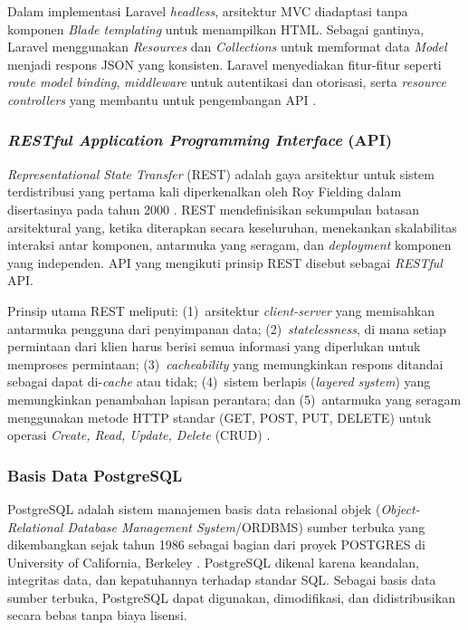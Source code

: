 Dalam implementasi Laravel \textit{headless}, arsitektur MVC diadaptasi tanpa komponen \textit{Blade templating} untuk menampilkan HTML. Sebagai gantinya, Laravel menggunakan \textit{Resources} dan \textit{Collections} untuk memformat data \textit{Model} menjadi respons JSON yang konsisten. Laravel menyediakan fitur-fitur seperti \textit{route model binding}, \textit{middleware} untuk autentikasi dan otorisasi, serta \textit{resource controllers} yang membantu untuk pengembangan API \citep{Laravel_2026_Docs}.


\subsubsection{\textit{RESTful Application Programming Interface} (API)}

\textit{Representational State Transfer} (REST) adalah gaya arsitektur untuk sistem terdistribusi yang pertama kali diperkenalkan oleh Roy Fielding dalam disertasinya pada tahun 2000 \citep{Fielding_2000_REST}. REST mendefinisikan sekumpulan batasan arsitektural yang, ketika diterapkan secara keseluruhan, menekankan skalabilitas interaksi antar komponen, antarmuka yang seragam, dan \textit{deployment} komponen yang independen. API yang mengikuti prinsip REST disebut sebagai \textit{RESTful} API.

Prinsip utama REST meliputi: (1)~arsitektur \textit{client-server} yang memisahkan antarmuka pengguna dari penyimpanan data; (2)~\textit{statelessness}, di mana setiap permintaan dari klien harus berisi semua informasi yang diperlukan untuk memproses permintaan; (3)~\textit{cacheability} yang memungkinkan respons ditandai sebagai dapat di-\textit{cache} atau tidak; (4)~sistem berlapis (\textit{layered system}) yang memungkinkan penambahan lapisan perantara; dan (5)~antarmuka yang seragam menggunakan metode HTTP standar (GET, POST, PUT, DELETE) untuk operasi \textit{Create, Read, Update, Delete} (CRUD) \citep{Richardson_2013_RESTfulWebAPIs}.

\subsubsection{Basis Data PostgreSQL}

PostgreSQL adalah sistem manajemen basis data relasional objek (\textit{Object-Relational Database Management System}/ORDBMS) sumber terbuka yang dikembangkan sejak tahun 1986 sebagai bagian dari proyek POSTGRES di University of California, Berkeley \citep{PostgreSQL_2026_About}. PostgreSQL dikenal karena keandalan, integritas data, dan kepatuhannya terhadap standar SQL. Sebagai basis data sumber terbuka, PostgreSQL dapat digunakan, dimodifikasi, dan didistribusikan secara bebas tanpa biaya lisensi.

